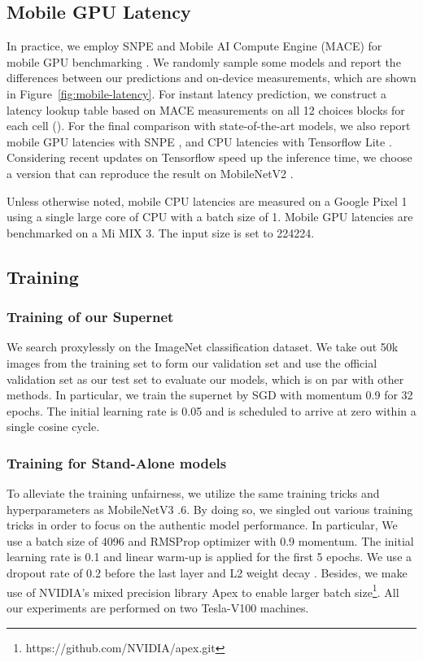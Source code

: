 \documentclass[letterpaper]{article} \usepackage{aaai20}  \usepackage{times}  \usepackage{helvet} \usepackage{courier}  \usepackage[hyphens]{url}  \usepackage{graphicx} \urlstyle{rm} \def\UrlFont{\rm}  \usepackage{graphicx}  \usepackage{amsmath}
\begin{document}
\subsection{Mobile GPU Latency}
In practice, we employ SNPE \cite{qualcomm2019snpe}  and Mobile AI Compute Engine (MACE) for mobile GPU benchmarking \cite{xiaomi2018mace}. We randomly sample some models  and report the differences between our predictions and on-device measurements, which are shown in Figure~\ref{fig:mobile-latency}. For instant latency prediction, we construct a latency lookup table based on MACE measurements on all 12 choices blocks for each cell (). For the final comparison with state-of-the-art models, we also report mobile GPU latencies with SNPE \cite{qualcomm2019snpe}, and CPU latencies with Tensorflow Lite \cite{tensorflow2015-whitepaper}. Considering recent updates on Tensorflow speed up the inference time, we choose a version that can reproduce the result on MobileNetV2 \cite{sandler2018mobilenetv2}. 

Unless otherwise noted, mobile CPU latencies are measured on a Google Pixel 1 using a single large core of CPU with a batch size of 1. Mobile GPU latencies are benchmarked on a Mi MIX 3. The input size is set to 224224.


\subsection{Training}
\subsubsection{Training of our Supernet}
We search proxylessly on the ImageNet \cite{deng2009imagenet} classification dataset. We take out 50k images  from the training set to form our validation set and use the official validation set as our test set to evaluate our models, which is on par with other methods. In particular, we train the supernet by SGD with momentum 0.9 for 32 epochs.  The initial learning rate is 0.05 and is scheduled to arrive at zero within a single cosine cycle. 



\subsubsection{Training for Stand-Alone models}
To alleviate the training unfairness, we utilize the same training tricks and hyperparameters as MobileNetV3 \cite{howard2019searching}.6. By doing so, we singled out various training tricks in order to focus on the authentic model performance. In particular, We use a batch size of 4096 and RMSProp optimizer with 0.9 momentum. The initial learning rate is 0.1 and linear warm-up \cite{goyal2017accurate} is applied for the first 5 epochs. We use a dropout rate of 0.2 before the last layer \cite{srivastava2014dropout} and L2 weight decay . Besides, we make use of NVIDIA's mixed precision library Apex to enable larger batch size\footnote{https://github.com/NVIDIA/apex.git}. All our experiments are performed on two Tesla-V100 machines.
\end{document}
